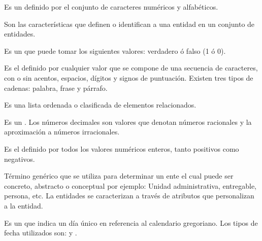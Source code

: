   \begin{description}
  
     Es un  definido por el conjunto de caracteres numéricos y alfabéticos.
   
    
     Son las características que definen o identifican a una entidad en un conjunto de entidades.

     Es un  que puede tomar los siguientes valores: verdadero ó falso (1 ó 0).
    
     Es el  definido por cualquier valor que se compone de una secuencia de caracteres, con o sin acentos, espacios, dígitos y signos de puntuación. Existen tres tipos de cadenas: palabra, frase y párrafo.
    
     Es una lista ordenada o clasificada de elementos relacionados.
    
     Es un  . Los números decimales son valores que denotan números racionales y la aproximación a números irracionales.
    
     Es el   definido por todos los valores numéricos enteros, tanto positivos como negativos.

     Término genérico que se utiliza para determinar un ente el cual puede ser concreto, abstracto o conceptual por ejemplo: Unidad administrativa, entregable, persona, etc. La entidades se caracterizan a través de atributos que personalizan a la entidad.		

     Es un  que indica un día único en referencia al calendario gregoriano. Los tipos de fecha utilizados son:  y . %


\end{description}
